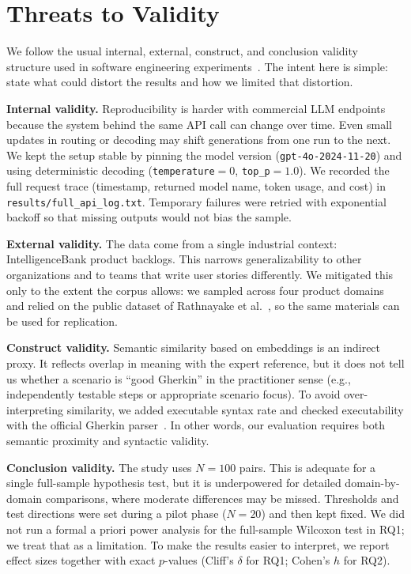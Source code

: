\section{Threats to Validity}
\label{sec:threats-validity}

We follow the usual internal, external, construct, and conclusion validity structure used in software engineering experiments~\cite{arcuri2011practical}. The intent here is simple: state what could distort the results and how we limited that distortion.

\textbf{Internal validity.}
Reproducibility is harder with commercial LLM endpoints because the system behind the same API call can change over time. Even small updates in routing or decoding may shift generations from one run to the next. We kept the setup stable by pinning the model version (\texttt{gpt-4o-2024-11-20}) and using deterministic decoding (\texttt{temperature}$=0$, \texttt{top\_p}$=1.0$). We recorded the full request trace (timestamp, returned model name, token usage, and cost) in \texttt{results/full\_api\_log.txt}. Temporary failures were retried with exponential backoff so that missing outputs would not bias the sample.

\textbf{External validity.}
The data come from a single industrial context: IntelligenceBank product backlogs. This narrows generalizability to other organizations and to teams that write user stories differently. We mitigated this only to the extent the corpus allows: we sampled across four product domains and relied on the public dataset of Rathnayake et al.~\cite{rathnayake2026llm}, so the same materials can be used for replication.

\textbf{Construct validity.}
Semantic similarity based on embeddings is an indirect proxy. It reflects overlap in meaning with the expert reference, but it does not tell us whether a scenario is ``good Gherkin'' in the practitioner sense (e.g., independently testable steps or appropriate scenario focus). To avoid over-interpreting similarity, we added executable syntax rate and checked executability with the official Gherkin parser~\cite{cucumber2023gherkin}. In other words, our evaluation requires both semantic proximity and syntactic validity.

\textbf{Conclusion validity.}
The study uses $N=100$ pairs. This is adequate for a single full-sample hypothesis test, but it is underpowered for detailed domain-by-domain comparisons, where moderate differences may be missed. Thresholds and test directions were set during a pilot phase ($N=20$) and then kept fixed. We did not run a formal a priori power analysis for the full-sample Wilcoxon test in RQ1; we treat that as a limitation. To make the results easier to interpret, we report effect sizes together with exact $p$-values (Cliff's $\delta$ for RQ1; Cohen's $h$ for RQ2).